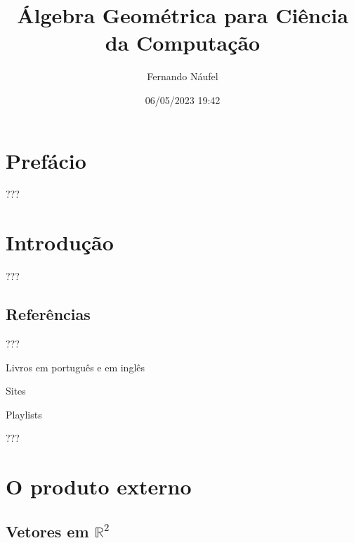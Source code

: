 \documentclass[
  letterpaper,
  DIV=11,
  numbers=noendperiod]{scrreprt}
\title{Álgebra Geométrica para Ciência da Computação}
\author{Fernando Náufel}
\date{06/05/2023 19:42}
\renewcommand*\contentsname{Índice}
\newcommand\contentsname{Índice}
\begin{document}
\maketitle


\ifdefined\Shaded\renewenvironment{Shaded}{\begin{tcolorbox}[frame hidden, boxrule=0pt, borderline west={3pt}{0pt}{shadecolor}, enhanced, sharp corners, interior hidden, breakable]}{\end{tcolorbox}}\fi

\renewcommand*\contentsname{Índice}
{
\hypersetup{linkcolor=}
\setcounter{tocdepth}{2}
\tableofcontents
}
\providecommand{\reais}{\mathbb{R}}
\providecommand{\vet}[1]{\mathbf{#1}}
\providecommand{\ve}[1]{\vet{e}_{#1}}

\hypertarget{prefuxe1cio}{%
\chapter*{Prefácio}\label{prefuxe1cio}}

???

\hypertarget{sec-intro}{%
\chapter{Introdução}\label{sec-intro}}

???

\hypertarget{referuxeancias}{%
\section{Referências}\label{referuxeancias}}

???

Livros em português e em inglês

Sites

Playlists

???

\providecommand{\reais}{\mathbb{R}}
\providecommand{\vet}[1]{\mathbf{#1}}
\providecommand{\ve}[1]{\vet{e}_{#1}}

\hypertarget{sec-prod-ext}{%
\chapter{O produto externo}\label{sec-prod-ext}}

\hypertarget{sec-vetores-r2}{%
\section{\texorpdfstring{Vetores em
$\mathbb{R}^2$}{Vetores em }}\label{sec-vetores-r2}}
\end{document}
